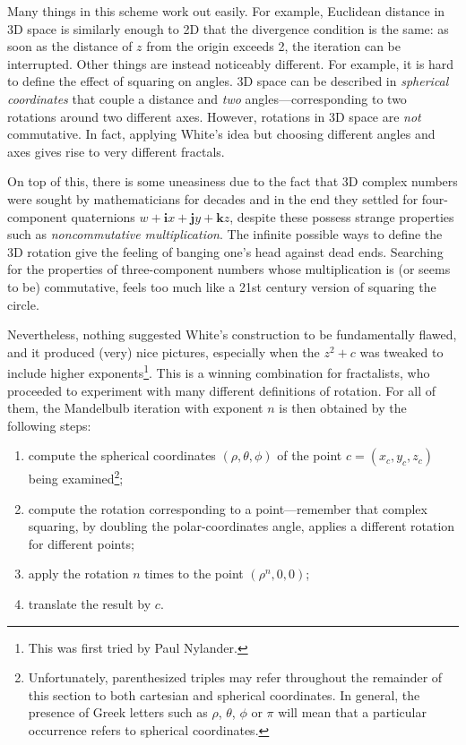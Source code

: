 \documentclass{article}
\let\vec\mathbf
\begin{document}
Many things in this scheme work out easily.  For example, Euclidean
distance in 3D space is similarly enough to 2D that the divergence
condition is the same: as soon as the distance of $z$ from the origin
exceeds 2, the iteration can be interrupted.  Other things are instead
noticeably different.  For example, it is hard to define the effect of
squaring on angles.  3D space can be described in \emph{spherical
  coordinates} that couple a distance and \emph{two}
angles---corresponding to two rotations around two different axes.
However, rotations in 3D space are \emph{not} commutative.  In fact,
applying White's idea but choosing different angles and axes gives
rise to very different fractals.

On top of this, there is some uneasiness due to the fact that 3D
complex numbers were sought by mathematicians for decades and in the
end they settled for four-component quaternions
$w+\vec{i}x+\vec{j}y+\vec{k}z$, despite these possess strange
properties such as \emph{noncommutative multiplication}.  The infinite
possible ways to define the 3D rotation give the feeling of banging
one's head against dead ends.  Searching for the properties of
three-component numbers whose multiplication is (or seems to be)
commutative, feels too much like a 21st century version of squaring
the circle.

Nevertheless, nothing suggested White's construction to be
fundamentally flawed, and it produced (very) nice pictures, especially
when the $z^2+c$ was tweaked to include higher exponents\footnote{This
  was first tried by Paul Nylander.}.  This is a winning combination
for fractalists, who proceeded to experiment with many different
definitions of rotation.  For all of them, the Mandelbulb iteration with
exponent $n$ is then obtained by the following steps:
\begin{enumerate}
\item \label{item:first-step}
  compute the spherical coordinates $(\rho,\theta,\phi)$ of the
  point $c=(x_c,y_c,z_c)$ being examined\footnote{Unfortunately,
    parenthesized triples may refer throughout the remainder of this
    section to both cartesian and spherical coordinates.  In general,
    the presence of Greek letters such as $\rho$, $\theta$, $\phi$ or
    $\pi$ will mean that a particular occurrence refers to spherical
    coordinates.};

\item \label{item:choice} compute the rotation corresponding to a
  point---remember that complex squaring, by doubling the
  polar-coordinates angle, applies a different rotation for different
  points;

\item \label{item:last-step}
  apply the rotation $n$ times to the point $(\rho^n,0,0)$;
\item translate the result by $c$.
\end{enumerate}
\end{document}
